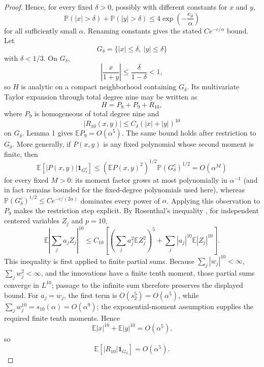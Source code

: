 \documentclass[11pt]{article}
\newcommand{\E}{\mathbb E}
\newcommand{\Prob}{\mathbb P}
\begin{document}
\begin{proof}
Hence, for every fixed $\delta>0$, possibly with different constants for
$x$ and $y$,
\begin{equation}
\Prob(|x|>\delta)+\Prob(|y|>\delta)
\le 4\exp\!\left(-\frac{c_\delta}{\alpha}\right)
\end{equation}
for all sufficiently small $\alpha$. Renaming constants gives the stated
$Ce^{-c/\alpha}$ bound.
Let
\begin{equation}
G_\delta=\{|x|\le\delta,\ |y|\le\delta\}
\end{equation}
with $\delta<1/3$. On $G_\delta$,
\begin{equation}
\left|\frac{x}{1+y}\right|\le\frac{\delta}{1-\delta}<1,
\end{equation}
so $H$ is analytic on a compact neighborhood containing $G_\delta$. Its multivariate Taylor expansion through total degree nine may be written as
\begin{equation}
H=P_8+P_9+R_{10},
\end{equation}
where $P_9$ is homogeneous of total degree nine and
\begin{equation}
|R_{10}(x,y)|\le C_\delta(|x|+|y|)^{10}
\end{equation}
on $G_\delta$. Lemma 1 gives $\E P_9=O(\alpha^5)$. The same bound holds after restriction to $G_\delta$. More generally, if $P(x,y)$ is any fixed polynomial whose second moment is finite, then
\begin{equation}
\E[|P(x,y)|\mathbf 1_{G_\delta^c}]
\le (\E P(x,y)^2)^{1/2}\Prob(G_\delta^c)^{1/2}
=O(\alpha^M)
\end{equation}
for every fixed $M>0$: its moment factor grows at most polynomially in $\alpha^{-1}$ (and in fact remains bounded for the fixed-degree polynomials used here), whereas $\Prob(G_\delta^c)^{1/2}\le C e^{-c/(2\alpha)}$ dominates every power of $\alpha$. Applying this observation to $P_9$ makes the restriction step explicit. By Rosenthal's inequality \cite{rosenthal1970}, for independent centered variables $Z_j$ and $p=10$,
\begin{equation}
\E\left|\sum_j a_jZ_j\right|^{10}
\le C_{10}\left[
\left(\sum_j a_j^2\E Z_j^2\right)^5
+\sum_j |a_j|^{10}\E|Z_j|^{10}
\right].
\end{equation}
This inequality is first applied to finite partial sums. Because
$\sum_j|w_j|^{10}<\infty$, $\sum_jw_j^2<\infty$, and the innovations have a
finite tenth moment, those partial sums converge in $L^{10}$; passage to the
infinite sum therefore preserves the displayed bound. For $a_j=w_j$, the
first term is $O(s_2^5)=O(\alpha^5)$, while
$\sum_jw_j^{10}=s_{10}(\alpha)=O(\alpha^9)$; the exponential-moment assumption supplies the required finite tenth moments. Hence
\begin{equation}
\E|x|^{10}+\E|y|^{10}=O(\alpha^5).
\end{equation}
so
\begin{equation}
\E[|R_{10}|\mathbf 1_{G_\delta}]=O(\alpha^5).
\end{equation}


\end{proof}
\end{document}
